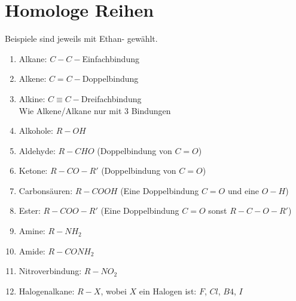 \section{Homologe Reihen}
Beispiele sind jeweils mit Ethan- gewählt.
\begin{enumerate}
    \item Alkane: $C-C-$Einfachbindung \\

    \item Alkene: $C=C-$Doppelbindung \\

    \item Alkine: $C\equiv C-$Dreifachbindung \\
        Wie Alkene/Alkane nur mit 3 Bindungen

    \item Alkohole: $R-OH$ \\

    \item Aldehyde: $R-CHO$ (Doppelbindung von $C=O$) \\

    \item Ketone: $R-CO-R'$ (Doppelbindung von $C=O$)

    \item Carbonsäuren: $R-COOH$ (Eine Doppelbindung $C=O$ und eine $O-H$)

    \item Ester: $R-COO-R'$ (Eine Doppelbindung $C=O$ sonst $R-C-O-R'$)

    \item Amine: $R-NH_2$

    \item Amide: $R-CONH_2$

    \item Nitroverbindung: $R-NO_2$

    \item Halogenalkane: $R-X$, wobei $X$ ein Halogen ist: $F$, $Cl$, $B4$, $I$

\end{enumerate}

